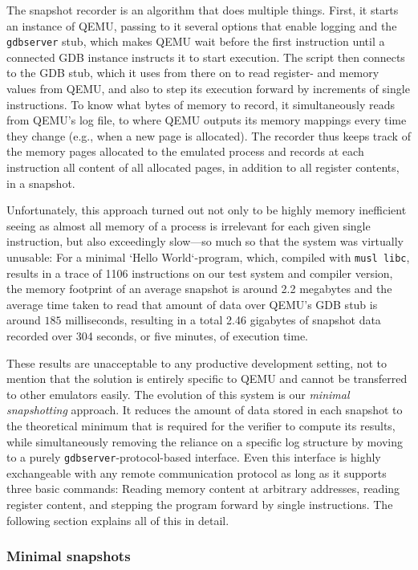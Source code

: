 The snapshot recorder is an algorithm that does multiple things. First, it starts an instance of QEMU, passing to it
several options that enable logging and the \texttt{gdbserver} stub, which makes QEMU wait before the first instruction
until a connected GDB instance instructs it to start execution. The script then connects to the GDB stub, which it uses
from there on to read register- and memory values from QEMU, and also to step its execution forward by increments of
single instructions. To know what bytes of memory to record, it simultaneously reads from QEMU's log file, to where QEMU
outputs its memory mappings every time they change (e.g., when a new page is allocated). The recorder thus keeps track
of the memory pages allocated to the emulated process and records at each instruction all content of all allocated
pages, in addition to all register contents, in a snapshot.

Unfortunately, this approach turned out not only to be highly memory inefficient seeing as almost all memory of a
process is irrelevant for each given single instruction, but also exceedingly slow---so much so that the system was
virtually unusable: For a minimal `Hello World`-program, which, compiled with \texttt{musl libc}, results in a trace of
1106 instructions on our test system and compiler version, the memory footprint of an average snapshot is around 2.2
megabytes and the average time taken to read that amount of data over QEMU's GDB stub is around $185$ milliseconds,
resulting in a total 2.46 gigabytes of snapshot data recorded over 304 seconds, or five minutes, of execution time.

These results are unacceptable to any productive development setting, not to mention that the solution is entirely
specific to QEMU and cannot be transferred to other emulators easily. The evolution of this system is our
\textit{minimal snapshotting} approach. It reduces the amount of data stored in each snapshot to the theoretical minimum
that is required for the verifier to compute its results, while simultaneously removing the reliance on a specific log
structure by moving to a purely \texttt{gdbserver}-protocol-based interface. Even this interface is highly exchangeable
with any remote communication protocol as long as it supports three basic commands: Reading memory content at arbitrary
addresses, reading register content, and stepping the program forward by single instructions. The following section
explains all of this in detail.

\subsubsection{Minimal snapshots}\label{sec:minimal_snapshots}

